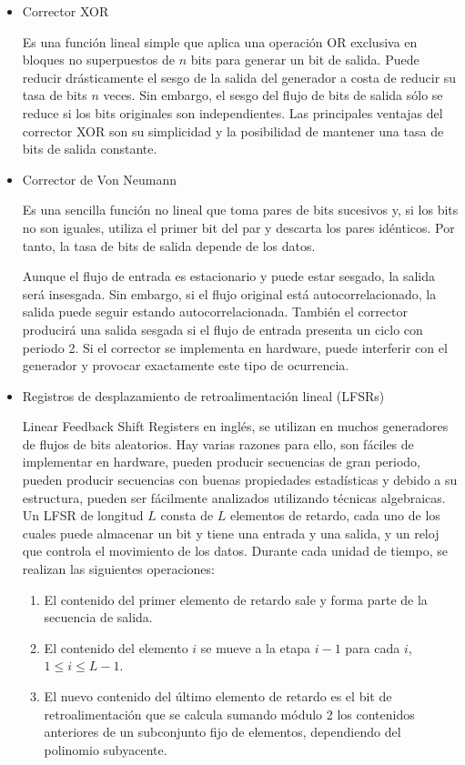 	\begin{itemize}
		\item Corrector XOR 
		
		Es una función lineal simple que aplica una operación OR exclusiva en bloques no superpuestos de $n$ bits para generar un bit de salida. Puede reducir drásticamente el sesgo de la salida del generador a costa de reducir su tasa de bits $n$ veces. Sin embargo, el sesgo del flujo de bits de salida sólo se reduce si los bits originales son independientes. Las principales ventajas del corrector XOR son su simplicidad y la posibilidad de mantener una tasa de bits de salida constante.

		\item Corrector de Von Neumann
		
		Es una sencilla función no lineal que toma pares de bits sucesivos y, si los bits no son iguales, utiliza el primer bit del par y descarta los pares idénticos. Por tanto, la tasa de bits de salida depende de los datos. 
		
		Aunque el flujo de entrada es estacionario y puede estar sesgado, la salida será insesgada. Sin embargo, si el flujo original está autocorrelacionado, la salida puede seguir estando autocorrelacionada. También el corrector producirá una salida sesgada si el flujo de entrada presenta un ciclo con periodo 2. Si el corrector se implementa en hardware, puede interferir con el generador y provocar exactamente este tipo de ocurrencia.
		
		
		\item Registros de desplazamiento de retroalimentación lineal (LFSRs)
		
		Linear Feedback Shift Registers en inglés, se utilizan en muchos generadores de flujos de bits aleatorios. Hay varias razones para ello, son fáciles de implementar en hardware, pueden producir secuencias de gran periodo, pueden producir secuencias con buenas propiedades estadísticas y  debido a su estructura, pueden ser fácilmente analizados utilizando técnicas algebraicas.	Un LFSR de longitud $L$ consta de $L$ elementos de retardo, cada uno de los cuales puede almacenar un bit y tiene una entrada y una salida, y un reloj que controla el movimiento de los datos. Durante cada unidad de tiempo, se realizan las siguientes operaciones:
		\begin{enumerate}[noitemsep, label=(\roman*)]
			 \item El contenido del primer elemento de retardo sale y forma parte de la secuencia de salida.
			 \item  El contenido del elemento $i$ se mueve a la etapa $i - 1$ para cada $i$, $1 \leq i \leq L - 1$.
			 \item El nuevo contenido del último elemento de retardo es el bit de retroalimentación que se calcula sumando módulo 2 los contenidos anteriores de un subconjunto fijo de elementos, dependiendo del polinomio subyacente.
		 \end{enumerate}	
		

\end{itemize}
